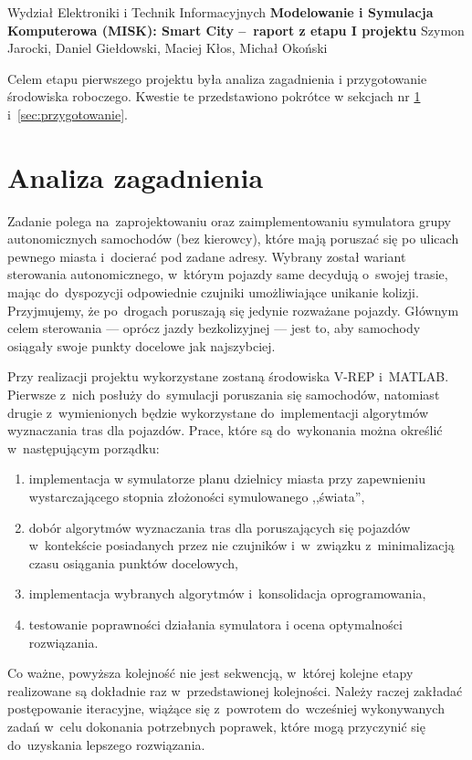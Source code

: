 \documentclass[11pt, a4paper, twoside]{article}
\begin{document}
	
	\begin{center} 
		{\Large Wydział Elektroniki i Technik Informacyjnych}
		\vskip0.2cm
		{\LARGE \textbf{Modelowanie i Symulacja Komputerowa (MISK): Smart City --~raport z etapu I projektu  } } 
		\vskip0.3cm
		{\Large Szymon Jarocki, Daniel Giełdowski, Maciej Kłos, Michał Okoński}
		\vskip0.8cm
	\end{center} 
	
	Celem etapu pierwszego projektu była analiza zagadnienia i przygotowanie środowiska roboczego. Kwestie te przedstawiono pokrótce w sekcjach nr \ref{sec:analiza} i~\ref{sec:przygotowanie}.	
	
	\section{Analiza zagadnienia}
	\label{sec:analiza}
	Zadanie polega na~zaprojektowaniu oraz zaimplementowaniu symulatora grupy autonomicznych samochodów (bez kierowcy), które mają poruszać się po ulicach pewnego miasta i~docierać pod zadane adresy. Wybrany został wariant sterowania autonomicznego, w~którym pojazdy same decydują o~swojej trasie, mając do~dyspozycji odpowiednie czujniki umożliwiające unikanie kolizji. Przyjmujemy, że po~drogach poruszają się jedynie rozważane pojazdy. Głównym celem sterowania --- oprócz jazdy bezkolizyjnej --- jest to, aby samochody osiągały swoje punkty docelowe jak najszybciej.
	
	Przy realizacji projektu wykorzystane zostaną środowiska V-REP i~MATLAB. Pierwsze z~nich posłuży do~symulacji poruszania się samochodów, natomiast drugie z~wymienionych będzie wykorzystane do~implementacji algorytmów wyznaczania tras dla pojazdów. Prace, które są do~wykonania można określić w~następującym porządku:
	\begin{enumerate}[1)]
		\item implementacja w symulatorze planu dzielnicy miasta przy zapewnieniu wystarczającego stopnia złożoności symulowanego ,,świata'',
		\item dobór algorytmów wyznaczania tras dla poruszających się pojazdów w~kontekście posiadanych przez nie czujników i~w~związku z~minimalizacją czasu osiągania punktów docelowych,
		\item implementacja wybranych algorytmów i~konsolidacja oprogramowania,
		\item testowanie poprawności działania symulatora i ocena optymalności rozwiązania.
	\end{enumerate}
	Co ważne, powyższa kolejność nie jest sekwencją, w~której kolejne etapy realizowane są dokładnie raz w~przedstawionej kolejności. Należy raczej zakładać postępowanie iteracyjne, wiążące się z~powrotem do~wcześniej wykonywanych zadań w~celu dokonania potrzebnych poprawek, które mogą przyczynić się do~uzyskania lepszego rozwiązania.
	
\end{document}
